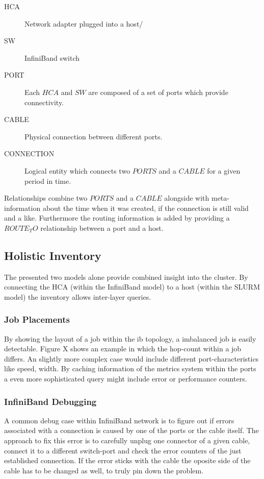 \begin{description}
    \item[HCA] Network adapter plugged into a host/
    \item[SW] InfiniBand switch
    \item[PORT] Each $HCA$ and $SW$ are composed of a set of ports which provide connectivity.
    \item[CABLE] Physical connection between different ports.
    \item[CONNECTION] Logical entity which connects two $PORTS$ and a $CABLE$ for a given period in time.
\end{description}

Relationships combine two $PORTS$ and a $CABLE$ alongside with meta-information about the time when it was created, if the connection is still valid and a like.
Furthermore the routing information is added by providing a $ROUTE_TO$ relationship between a port and a host.

\subsection{Holistic Inventory}
The presented two models alone provide combined insight into the cluster. By connecting the HCA (within the InfiniBand model) to a host (within the SLURM model) the inventory allows inter-layer queries.

\subsubsection{Job Placements}
By showing the layout of a job within the \gls{ib} topology, a imbalanced job is easily detectable. Figure X shows an example in which the hop-count within a job differs.
An slightly more complex case would include different port-characteristics like speed, width.
By caching information of the metrics system within the ports a even more sophisticated query might include error or performance counters.

\subsubsection{InfiniBand Debugging}
A common debug case within InfiniBand network is to figure out if errors associated with a connection is caused by one of the ports or the cable itself.
The approach to fix this error is to carefully unplug one connector of a given cable, connect it to a different switch-port and check the error counters of the just established connection.
If the error sticks with the cable the oposite side of the cable has to be changed as well, to truly pin down the problem.

